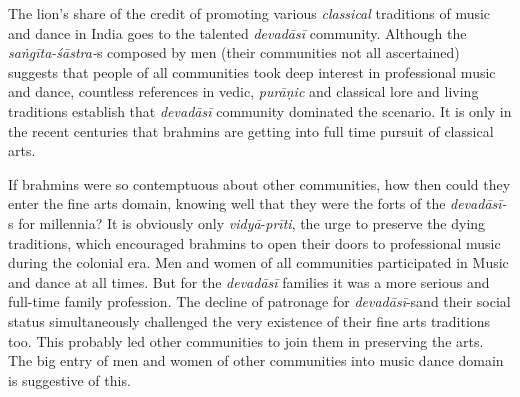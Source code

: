 The lion’s share of the credit of promoting various \textit{classical} traditions of music and dance in India goes to the talented \textit{devadāsī} community. Although the \textit{saṅgīta-śāstra-}s composed by men (their communities not all ascertained) suggests that people of all communities took deep interest in professional music and dance, countless references in vedic, \textit{purāṇic} and classical lore and living traditions establish that \textit{devadāsī} community dominated the scenario. It is only in the recent centuries that brahmins are getting into full time pursuit of classical arts.

If brahmins were so contemptuous about other communities, how then could they enter the fine arts domain, knowing well that they were the forts of the \textit{devadāsī-}s for millennia? It is obviously only \textit{vidyā}-\textit{prīti}, the urge to preserve the dying traditions, which encouraged brahmins to open their doors to professional music during the colonial era. Men and women of all communities participated in Music and dance at all times. But for the \textit{devadāsī} families it was a more serious and full-time family profession. The decline of patronage for \textit{devadāsī}-s\break and their social status simultaneously challenged the very existence of their fine arts traditions too. This probably led other communities to join them in preserving the arts. The big entry of men and women of other communities into music dance domain is suggestive of this.

